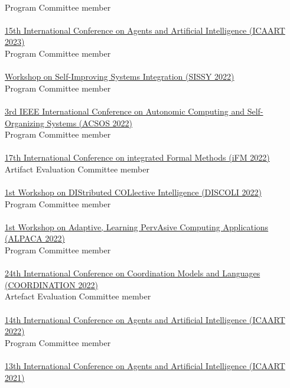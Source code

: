 \\ Program Committee member \\
\halfblankline \\
\href{https://icaart.scitevents.org/}{15th International Conference on Agents and Artificial Intelligence
(ICAART 2023)}
\\ Program Committee member \\
\halfblankline \\
\href{https://sissy.telecom-paristech.fr/}{Workshop on Self-Improving Systems Integration (SISSY 2022)}
\\ Program Committee member \\
\halfblankline \\
\href{https://conf.researchr.org/home/acsos-2022/}{3rd IEEE International Conference on Autonomic Computing and Self-Organizing Systems
(ACSOS 2022)}
\\ Program Committee member \\
\halfblankline \\
\href{https://ifm22.si.usi.ch/}{17th International Conference on integrated Formal Methods
(iFM 2022)}
\\ Artifact Evaluation Committee member \\
\halfblankline \\
\href{https://discoli-workshop.github.io/2022/}{1st Workshop on DIStributed COLlective Intelligence
(DISCOLI 2022)}
\\ Program Committee member \\
\halfblankline \\
\href{https://www.discotec.org/2022/coordination}{1st Workshop on Adaptive, Learning PervAsive Computing Applications
(ALPACA 2022)}
\\ Program Committee member \\
\halfblankline \\
\href{https://www.discotec.org/2022/coordination}{24th International Conference on Coordination Models and Languages
(COORDINATION 2022)}
\\ Artefact Evaluation Committee member \\
\halfblankline \\
\href{http://www.icaart.org/?y=2022}{14th International Conference on Agents and Artificial Intelligence
(ICAART 2022)}
\\ Program Committee member \\
\halfblankline \\
\href{http://www.icaart.org/?y=2021}{13th International Conference on Agents and Artificial Intelligence
(ICAART 2021)}
